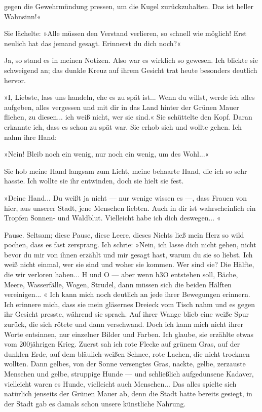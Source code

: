 gegen die Gewehrmündung pressen, um die Kugel zurückzuhalten. Das
ist heller Wahnsinn!«

Sie lächelte: »Alle müssen den Verstand verlieren, so schnell wie
möglich! Erst neulich hat das jemand gesagt. Erinnerst du dich
noch?«

Ja, so stand es in meinen Notizen. Also war es wirklich so gewesen.
Ich blickte sie schweigend an; das dunkle Kreuz auf ihrem Gesicht
trat heute besonders deutlich hervor.

»I, Liebste, lass uns handeln, ehe es zu spät ist... Wenn du
willst, werde ich alles aufgeben, alles vergessen und mit dir in
das Land hinter der Grünen Mauer fliehen, zu diesen... ich weiß
nicht, wer sie sind.« Sie schüttelte den Kopf. Daran erkannte ich,
dass es schon zu spät war. Sie erhob sich und wollte gehen. Ich
nahm ihre Hand:

»Nein! Bleib noch ein wenig, nur noch ein wenig, um des Wohl...«

Sie hob meine Hand langsam zum Licht, meine behaarte Hand, die ich
so sehr hasste. Ich wollte sie ihr entwinden, doch sie hielt sie
fest.

»Deine Hand... Du weißt ja nicht — nur wenige wissen es —, dass
Frauen von hier, aus unserer Stadt, jene Menschen liebten. Auch in
dir ist wahrscheinlich ein Tropfen Sonnen- und Waldblut. Vielleicht
habe ich dich deswegen... «

Pause. Seltsam; diese Pause, diese Leere, dieses Nichts ließ mein
Herz so wild pochen, dass es fast zersprang. Ich schrie: »Nein, ich
lasse dich nicht gehen, nicht bevor du mir von ihnen erzählt und
mir gesagt hast, warum du sie so liebst. Ich weiß nicht einmal, wer
sie sind und woher sie kommen. Wer sind sie? Die Hälfte, die wir
verloren haben... H und O — aber wenn h3O entstehen soll, Bäche,
Meere, Wasserfälle, Wogen, Strudel, dann müssen sich die beiden
Hälften vereinigen... « Ich kann mich noch deutlich an jede ihrer
Bewegungen erinnern. Ich erinnere mich, dass sie mein gläsernes
Dreieck vom Tisch nahm und es gegen ihr Gesicht presste, während
sie sprach. Auf ihrer Wange blieb eine weiße Spur zurück, die sich
rötete und dann verschwand. Doch ich kann mich nicht ihrer Worte
entsinnen, nur einzelner Bilder und Farben. Ich glaube, sie
erzählte etwas vom 200jährigen Krieg. Zuerst sah ich rote Flecke
auf grünem Gras, auf der dunklen Erde, auf dem bläulich-weißen
Schnee, rote Lachen, die nicht trocknen wollten. Dann gelbes, von
der Sonne versengtes Gras, nackte, gelbe, zerzauste Menschen und
gelbe, struppige Hunde — und schließlich aufgedunsene Kadaver,
vielleicht waren es Hunde, vielleicht auch Menschen... Das alles
spielte sich natürlich jenseits der Grünen Mauer ab, denn die Stadt
hatte bereits gesiegt, in der Stadt gab es damals schon unsere
künstliche Nahrung.

